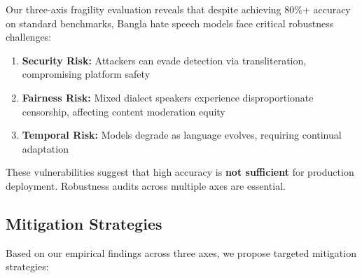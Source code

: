 \documentclass[conference]{IEEEtran}
\begin{document}
Our three-axis fragility evaluation reveals that despite achieving 80\%+ accuracy on standard benchmarks, Bangla hate speech models face critical robustness challenges:

\begin{enumerate}
\item \textbf{Security Risk:} Attackers can evade detection via transliteration, compromising platform safety
\item \textbf{Fairness Risk:} Mixed dialect speakers experience disproportionate censorship, affecting content moderation equity
\item \textbf{Temporal Risk:} Models degrade as language evolves, requiring continual adaptation
\end{enumerate}

These vulnerabilities suggest that high accuracy is \textbf{not sufficient} for production deployment. Robustness audits across multiple axes are essential.

\subsection{Mitigation Strategies}

Based on our empirical findings across three axes, we propose targeted mitigation strategies:
\end{document}
